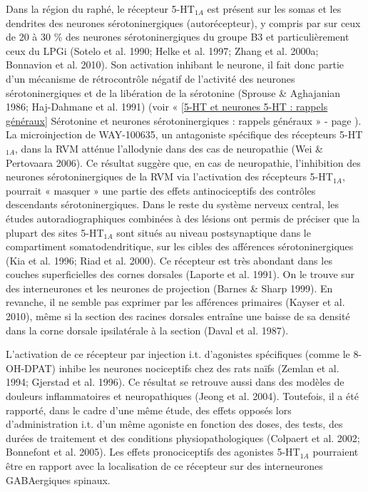 \documentclass[a4paper,12pt,twoside]{report}
\begin{document}
Dans la région du raphé, le récepteur 5-HT$_{1A}$ est présent sur les somas et les dendrites des neurones sérotoninergiques (autorécepteur), y compris par sur ceux de 20 à 30 \% des neurones sérotoninergiques du groupe B3 et particulièrement ceux du LPGi (Sotelo et al. 1990; Helke et al. 1997; Zhang et al. 2000a; Bonnavion et al. 2010). Son activation inhibant le neurone, il fait donc partie d’un mécanisme de rétrocontrôle négatif de l’activité des neurones sérotoninergiques et de la libération de la sérotonine (Sprouse \& Aghajanian 1986; Haj-Dahmane et al. 1991) (voir « \ref{5-HT et neurones 5-HT : rappels généraux} Sérotonine et neurones sérotoninergiques : rappels généraux » - page \pageref{5-HT et neurones 5-HT : rappels généraux}). La microinjection de WAY-100635, un antagoniste spécifique des récepteurs 5-HT$_{1A}$, dans la RVM atténue l’allodynie dans des cas de neuropathie (Wei \& Pertovaara 2006). Ce résultat suggère que, en cas de neuropathie, l’inhibition des neurones sérotoninergiques de la RVM via l’activation des récepteurs 5-HT$_{1A}$, pourrait « masquer » une partie des effets antinociceptifs des contrôles descendants sérotoninergiques. 
Dans le reste du système nerveux central, les études autoradiographiques combinées à des lésions ont permis de préciser que la plupart des sites 5-HT$_{1A}$ sont situés au niveau postsynaptique dans le compartiment somatodendritique, sur les cibles des afférences sérotoninergiques (Kia et al. 1996; Riad et al. 2000). Ce récepteur est très abondant dans les couches superficielles des cornes dorsales (Laporte et al. 1991). On le trouve sur des interneurones et les neurones de projection (Barnes \& Sharp 1999). En revanche, il ne semble pas exprimer par les afférences primaires (Kayser et al. 2010), même si la section des racines dorsales entraîne une baisse de sa densité dans la corne dorsale ipsilatérale à la section (Daval et al. 1987).

L’activation de ce récepteur par injection i.t. d’agonistes spécifiques (comme le 8-OH-DPAT) inhibe les neurones nociceptifs chez des rats naïfs (Zemlan et al. 1994; Gjerstad et al. 1996). Ce résultat se retrouve aussi dans des modèles de douleurs inflammatoires et neuropathiques (Jeong et al. 2004). Toutefois, il a été rapporté, dans le cadre d’une même étude, des effets opposés lors d’administration i.t. d’un même agoniste en fonction des doses, des tests, des durées de traitement et des conditions physiopathologiques (Colpaert et al. 2002; Bonnefont et al. 2005). Les effets pronociceptifs des agonistes 5-HT$_{1A}$ pourraient être en rapport avec la localisation de ce récepteur sur des interneurones GABAergiques spinaux.
\end{document}
